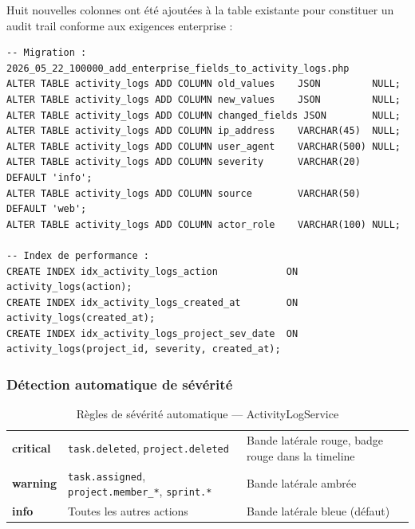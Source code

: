 Huit nouvelles colonnes ont été ajoutées à la table existante pour constituer
un audit trail conforme aux exigences enterprise :

\begin{lstlisting}[style=sqlstyle,caption={Colonnes ajoutées — migration Sprint 6},
  label={lst:migration_s6}]
-- Migration : 2026_05_22_100000_add_enterprise_fields_to_activity_logs.php
ALTER TABLE activity_logs ADD COLUMN old_values    JSON         NULL;
ALTER TABLE activity_logs ADD COLUMN new_values    JSON         NULL;
ALTER TABLE activity_logs ADD COLUMN changed_fields JSON        NULL;
ALTER TABLE activity_logs ADD COLUMN ip_address    VARCHAR(45)  NULL;
ALTER TABLE activity_logs ADD COLUMN user_agent    VARCHAR(500) NULL;
ALTER TABLE activity_logs ADD COLUMN severity      VARCHAR(20)  DEFAULT 'info';
ALTER TABLE activity_logs ADD COLUMN source        VARCHAR(50)  DEFAULT 'web';
ALTER TABLE activity_logs ADD COLUMN actor_role    VARCHAR(100) NULL;

-- Index de performance :
CREATE INDEX idx_activity_logs_action            ON activity_logs(action);
CREATE INDEX idx_activity_logs_created_at        ON activity_logs(created_at);
CREATE INDEX idx_activity_logs_project_sev_date  ON activity_logs(project_id, severity, created_at);
\end{lstlisting}

\subsubsection{Détection automatique de sévérité}

\begin{table}[H]
  \centering
  \caption{Règles de sévérité automatique — ActivityLogService}
  \label{tab:severity_rules}
  \begin{tabularx}{\textwidth}{L{2.5cm}L{4cm}X}
    \toprule
     &  &  \\
    \midrule
    \textbf{critical} & \texttt{task.deleted}, \texttt{project.deleted} &
      Bande latérale rouge, badge rouge dans la timeline \\
    \textbf{warning}  & \texttt{task.assigned}, \texttt{project.member\_*},
      \texttt{sprint.*} & Bande latérale ambrée \\
    \textbf{info}     & Toutes les autres actions &
      Bande latérale bleue (défaut) \\
    \bottomrule
  \end{tabularx}
\end{table}

